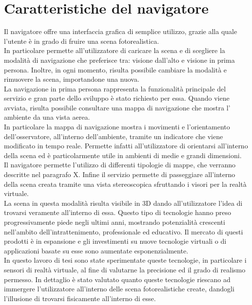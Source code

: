 \section{Caratteristiche del navigatore}
\label{sec:chapter_navigazione_scena_caratt_navigat}

Il navigatore offre una interfaccia grafica di semplice utilizzo, grazie alla quale l’utente è in grado di fruire una scena fotorealistica.
\\
In particolare permette all’utilizzatore di caricare la scena e di scegliere la modalità di navigazione che preferisce tra: visione dall’alto e visione in prima persona. 
Inoltre, in ogni momento, risulta possibile cambiare la modalità e rimuovere la scena, importandone una nuova.
\\
La navigazione in prima persona rappresenta la funzionalità principale del servizio e gran parte dello sviluppo è stato richiesto per essa.
Quando viene avviata, risulta possibile consultare una mappa di navigazione che mostra l’ ambiente da una vista aerea.
\\
In particolare la mappa di navigazione mostra i movimenti e l’orientamento dell’osservatore, all’interno dell’ambiente, tramite un indicatore che viene modificato in tempo reale. 
Permette infatti all’utilizzatore di orientarsi all’interno della scena ed è particolarmente utile in ambienti di medie e grandi dimensioni.
\\
Il navigatore permette l’utilizzo di differenti tipologie di mappe, che verranno descritte nel paragrafo X.
Infine il servizio permette di passeggiare all’interno della scena creata tramite una vista stereoscopica sfruttando i visori per la realtà virtuale. 
\\
La scena in questa modalità risulta visibile in 3D dando all’utilizzatore l’idea di trovarsi veramente all’interno di essa.
Questo tipo di tecnologie hanno preso progressivamente piede negli ultimi anni, mostrando potenzialità crescenti nell’ambito dell’intrattenimento, professionale ed educativo.
Il mercato di questi prodotti è in espansione e gli investimenti su nuove tecnologie virtuali o di applicazioni basate su esse sono aumentate esponenzialmente. 
\\
In questo lavoro di tesi sono state sperimentate queste tecnologie, in particolare i sensori di realtà virtuale, al fine di valutarne la precisione ed il grado di realismo permesso. 
In dettaglio è stato valutato quanto queste tecnologie riescano ad immergere l’utilizzatore all’interno delle scena fotorealistiche create, dandogli l’illusione di trovarsi fisicamente all’interno di esse.

